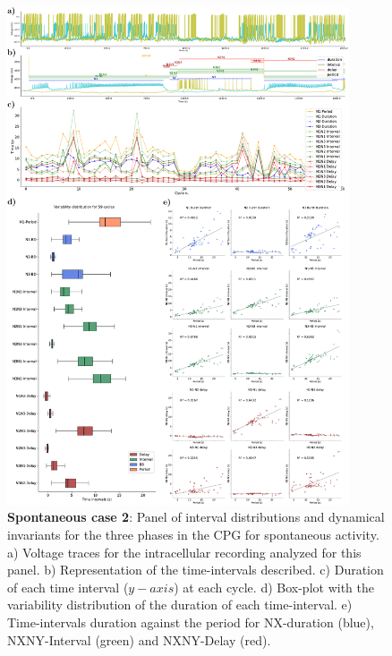 \begin{figure}[htbp]
	\centering
	\includegraphics[width=0.9\textwidth]{./img/invariants/data/SUSSEX/prep3/images/3phases/panel_with_intervals.pdf}
	\caption{\textbf{Spontaneous case 2}: Panel of interval distributions and dynamical invariants for the three phases in the CPG for spontaneous activity. a) Voltage traces for the intracellular recording analyzed for this panel. b) Representation of the time-intervals described. c) Duration of each time interval ($y-axis$) at each cycle. d) Box-plot with the variability distribution of the duration of each time-interval. e) Time-intervals duration against the period for NX-duration (blue), NXNY-Interval (green) and NXNY-Delay (red).}
	\label{fig:prep3 invariants}
\end{figure}

